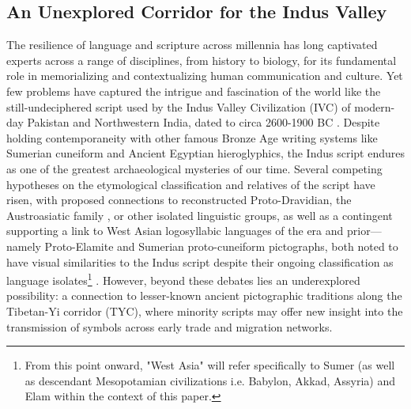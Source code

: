 \documentclass[11pt,a4paper,oneside]{report}
\begin{document}
\subsection{An Unexplored Corridor for the Indus Valley}
\noindent\hspace{1cm}
The resilience of language and scripture across millennia has long captivated experts across a range of disciplines, from history to biology, for its fundamental role in memorializing and contextualizing human communication and culture. Yet few problems have captured the intrigue and fascination of the world like the still-undeciphered script used by the Indus Valley Civilization (IVC) of modern-day Pakistan and Northwestern India, dated to circa 2600-1900 BC \cite{parpola_special_2005}. Despite holding contemporaneity with other famous Bronze Age writing systems like Sumerian cuneiform and Ancient Egyptian hieroglyphics, the Indus script endures as one of the greatest archaeological mysteries of our time. Several competing hypotheses on the etymological classification and relatives of the script have risen, with proposed connections to reconstructed Proto-Dravidian, the Austroasiatic family \cite{witzel_linguistic_2009}, or other isolated linguistic groups, as well as a contingent supporting a link to West Asian logosyllabic languages of the era and prior—namely Proto-Elamite and Sumerian proto-cuneiform pictographs, both noted to have visual similarities to the Indus script despite their ongoing classification as language isolates\footnote{From this point onward, "West Asia" will refer specifically to Sumer (as well as descendant Mesopotamian civilizations i.e. Babylon, Akkad, Assyria) and Elam within the context of this paper.} \cite{mcalpin_toward_1974}. However, beyond these debates lies an underexplored possibility: a connection to lesser-known ancient pictographic traditions along the Tibetan-Yi corridor (TYC), where minority scripts may offer new insight into the transmission of symbols across early trade and migration networks.
\end{document}

